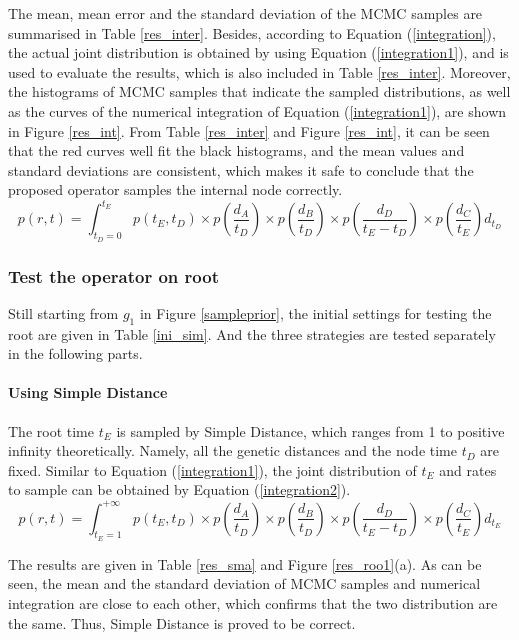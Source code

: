 \documentclass{bmcart}
\begin{document}
\begin{backmatter}
The mean, mean error and the standard deviation of the MCMC samples are summarised in Table \ref{res_inter}. Besides, according to Equation (\ref{integration}), the actual joint distribution is obtained by using Equation (\ref{integration1}), and is used to evaluate the results, which is also included in Table \ref{res_inter}. Moreover, the histograms of MCMC samples that indicate the sampled distributions, as well as the curves of the numerical integration of Equation (\ref{integration1}), are shown in Figure \ref{res_int}. From Table \ref{res_inter} and Figure \ref{res_int}, it can be seen that the red curves well fit the black histograms, and the mean values and standard deviations are consistent, which makes it safe to conclude that the proposed operator samples the internal node correctly.
\begin{equation}
\label{integration1}
p(r,t) = \int_{{t_D} = 0}^{{t_E}} {p({t_E},{t_D}) \times p(\frac{{{d_A}}}{{{t_D}}}) \times p(\frac{{{d_B}}}{{{t_D}}}) \times p(\frac{{{d_D}}}{{{t_E} - {t_D}}}) \times p(\frac{{{d_C}}}{{{t_E}}}){d_{t_D}}}
\end{equation}
\subsubsection*{Test the operator on root}
Still starting from $g_1$ in Figure \ref{sampleprior}, the initial settings for testing the root are given in Table \ref{ini_sim}. And the three strategies are tested separately in the following parts.

\paragraph*{Using Simple Distance}

The root time $t_E$ is sampled by Simple Distance, which ranges from 1 to positive infinity theoretically. Namely, all the genetic distances and the node time $t_D$  are fixed. Similar to Equation (\ref{integration1}), the joint distribution of $t_E$ and rates to sample can be obtained by Equation (\ref{integration2}).
\begin{equation}
\label{integration2}
p(r,t) = \int_{{t_E} = 1}^{ + \infty } {p({t_E},{t_D}) \times p(\frac{{{d_A}}}{{{t_D}}}) \times p(\frac{{{d_B}}}{{{t_D}}}) \times p(\frac{{{d_D}}}{{{t_E} - {t_D}}}) \times p(\frac{{{d_C}}}{{{t_E}}}){d_{t_E}}}
\end{equation}

The results are given in Table \ref{res_sma} and Figure \ref{res_roo1}(a). As can be seen, the mean and the standard deviation of MCMC samples and numerical integration are close to each other, which confirms that the two distribution are the same. Thus, Simple Distance is proved to be correct.


\end{backmatter}
\end{document}
